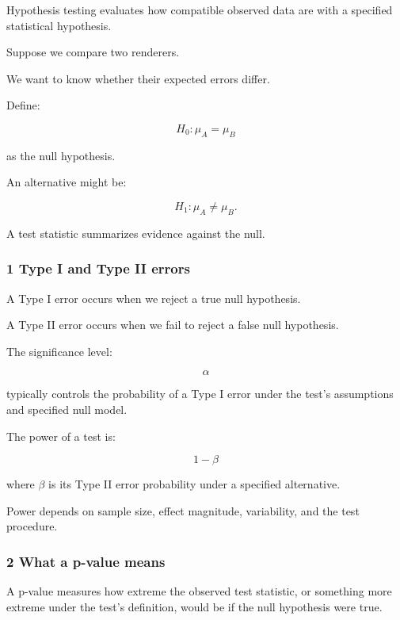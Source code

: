 \hypertarget{02-foundations-ii-ch030-hypothesis-testing}{}

Hypothesis testing evaluates how compatible observed data are with a specified statistical hypothesis.

Suppose we compare two renderers.

We want to know whether their expected errors differ.

Define:

\[
 H_0:\mu_A=\mu_B
\]

as the null hypothesis.

An alternative might be:

\[
 H_1:\mu_A\ne\mu_B.
\]

A test statistic summarizes evidence against the null.

\subsubsection{1 Type I and Type II errors}\label{02-foundations-ii-ch030-type-i-and-type-ii-errors}

\hypertarget{02-foundations-ii-ch030-type-i-and-type-ii-errors}{}

A Type I error occurs when we reject a true null hypothesis.

A Type II error occurs when we fail to reject a false null hypothesis.

The significance level:

\[
 \alpha
\]

typically controls the probability of a Type I error under the test's assumptions and specified null model.

The power of a test is:

\[
 \boxed{ 1-\beta }
\]

where \(\beta\) is its Type II error probability under a specified alternative.

Power depends on sample size, effect magnitude, variability, and the test procedure.

\subsubsection{2 What a p-value means}\label{02-foundations-ii-ch030-what-a-p-value-means}

\hypertarget{02-foundations-ii-ch030-what-a-p-value-means}{}

A p-value measures how extreme the observed test statistic, or something more extreme under the test's definition, would be if the null hypothesis were true.

